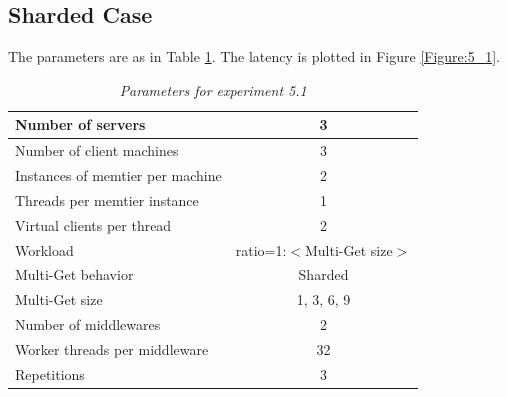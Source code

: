 \documentclass[11pt,a4paper]{article}
\begin{document}
\subsection{Sharded Case}

The parameters are as in Table \ref{Table:5_1_table}. The latency is plotted in Figure \ref{Figure:5_1}.

\begin{table}[H]
	\centering
		\begin{tabular}{|l|c|}
			\hline Number of servers                						& 3                       \\ 
			\hline Number of client machines        				& 3                       \\ 
			\hline Instances of memtier per machine 			& 2                       \\ 
			\hline Threads per memtier instance     				& 1                       \\
			\hline Virtual clients per thread       					& 2     		            \\ 
			\hline Workload                         							& ratio=1:$<$Multi-Get size$>$           \\
			\hline Multi-Get behavior               						& Sharded                 \\
			\hline Multi-Get size                  							& 1, 3, 6, 9                \\
			\hline Number of middlewares           					& 2                       \\
			\hline Worker threads per middleware    			& 32 \\
			\hline Repetitions                     							& 3      \\ 
			\hline 
		\end{tabular}
	\caption{\textit{Parameters for experiment 5.1}}
	\label{Table:5_1_table}
\end{table}
\end{document}
